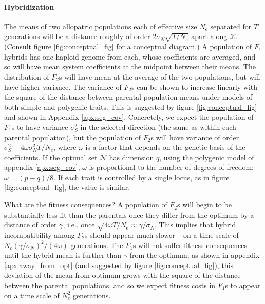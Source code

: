 \documentclass{article}
\newcommand{\1}{\mathbbm{1}}
\newcommand{\allS}{\mathcal{N}}
\newcommand{\optx}{\mathcal{X}}
\begin{document}
\paragraph{Hybridization}
The means of two allopatric populations each of effective size $N_e$ separated for $T$ generations
will be a distance roughly of order $2\sigma_N \sqrt{T/N_e}$ apart along $\optx$.
(Consult figure \ref{fig:conceptual_fig} for a conceptual diagram.)
A population of $F_1$ hybrids has one haploid genome from each,
whose coefficients are averaged,
and so will have mean system coefficients at the midpoint between their means.
The distribution of $F_2$s will have mean at the average of the two populations,
but will have higher variance.
The variance of $F_2$s can be shown to increase linearly with the square of the distance between
parental population means
under models of both simple and polygenic traits.
This is suggested by figure \ref{fig:conceptual_fig} and shown in Appendix \ref{apx:seg_cov}.
Concretely, we expect the population of $F_1$s to have variance $\sigma^2_S$ in the selected direction
(the same as within each parental population),
but the population of $F_2$s will have variance of order $\sigma^2_S + 4 \omega \sigma^2_N T/N_e$,
where $\omega$ is a factor that depends on the genetic basis of the coefficients.
If the optimal set $\allS$ has dimension $q$,
using the polygenic model of appendix \ref{apx:seg_cov}, 
$\omega$ is proportional to the number of degrees of freedom: $\omega = (p-q)/8$.
If each trait is controlled by a single locus, as in figure \ref{fig:conceptual_fig},
the value is similar.


What are the fitness consequences?
A population of $F_2$s will begin to be substantially less fit than the parentals
once they differ from the optimum by a distance of order $\gamma$,
i.e., once $\sqrt{4 \omega T/N_e} \approx \gamma / \sigma_N$.
This implies that hybrid incompatibility among $F_2$s should appear much slower --
on a time scale of $N_e (\gamma / \sigma_N)^2 / (4 \omega)$ generations.
The $F_1$s will not suffer fitness consequences until the hybrid mean is further than $\gamma$ from the optimum;
as shown in appendix \ref{apx:away_from_opt} (and suggested by figure \ref{fig:conceptual_fig}),
this deviation of the mean from optimum grows with the square of the distance between the parental populations,
and so we expect fitness costs in $F_1$s to appear on a time scale of $N_e^2$ generations.
\end{document}
